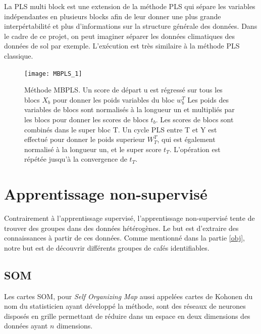 

La PLS multi block est une extension de la méthode PLS qui sépare les variables indépendantes en plusieurs blocks afin de leur donner une plus grande interpértabilité et plus d'informations sur la structure générale des données. Dans le cadre de ce projet, on peut imaginer séparer les données climatiques des données de sol par exemple.   
L'exécution est très similaire à la méthode PLS classique.  

\begin{figure}[H] 
	\centering
	\texttt{[image: MBPLS\_1]} 
	\caption{\label{MBPLSschema} Méthode MBPLS. Un score de départ u est régressé sur tous les blocs $ X_b $ pour donner les poids variables du bloc $ w^T_b $ Les poids des variables de blocs sont normalisés à la longueur un et multipliés par les blocs pour donner les scores de blocs $ t_b $.  Les scores de blocs sont combinés dans le super bloc T. Un cycle PLS entre T et Y est effectué pour donner le poids superieur $ W^T_T $, qui est également normalisé à la longueur un, et le super score $ t_T $. L'opération est répétée jusqu'à la convergence de $ t_T $. \cite{CEM:CEM515}} 
\end{figure} 






\newpage

\section{Apprentissage non-supervisé}
Contrairement à l'apprentissage supervisé, l'apprentissage non-supervisé tente de trouver des groupes dans des données hétérogènes. Le but est d'extraire des connaissances à partir de ces données. Comme mentionné dans la partie \ref{obj}, notre but est de découvrir différents groupes de cafés identifiables. 


\subsection{SOM}


Les cartes SOM, pour \textit{Self Organizing Map} aussi appelées cartes de Kohonen du nom du statisticien ayant développé la méthode, sont des réseaux de neurones disposés en grille permettant de réduire dans un espace en deux dimensions des données ayant $n$ dimensions.\\
 

